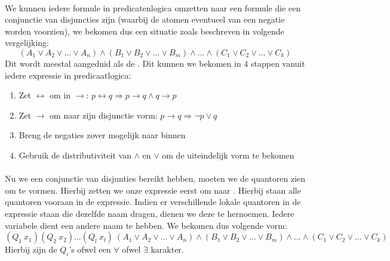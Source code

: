 \paragraph{}We kunnen iedere formule in predicatenlogica omzetten naar een formule die een conjunctie van disjuncties zijn (waarbij de atomen eventueel van een negatie worden voorzien), we bekomen dus een situatie zoals beschreven in volgende vergelijking:
\begin{equation}
\left(A_1\vee A_2\vee\ldots\vee A_n\right)\wedge\left(B_1\vee B_2\vee\ldots\vee B_m\right)\wedge\ldots\wedge\left(C_1\vee C_2\vee\ldots\vee C_k\right)
\end{equation}
Dit wordt meestal aangeduid als de . Dit kunnen we bekomen in 4 stappen vanuit iedere expressie in predicaatlogica:
\begin{enumerate}
 \item Zet $\leftrightarrow$ om in $\rightarrow$: $p\leftrightarrow q\Rightarrow p\rightarrow q\wedge q\rightarrow p$
 \item Zet $\rightarrow$ om naar zijn disjunctie vorm: $p\rightarrow q\Rightarrow \neg p\vee q$
 \item Breng de negaties zover mogelijk naar binnen
 \item Gebruik de distributiviteit van $\wedge$ en $\vee$ om de uiteindelijk vorm te bekomen
\end{enumerate}
\paragraph{}
Nu we een conjunctie van disjunties bereikt hebben, moeten we de quantoren zien om te vormen. Hierbij zetten we onze expressie eerst om naar . Hierbij staan alle quantoren vooraan in de expressie. Indien er verschillende lokale quantoren in de expressie staan die dezelfde naam dragen, dienen we deze te hernoemen. Iedere variabele dient een andere naam te hebben. We bekomen dus volgende vorm:
\begin{equation}
\left(Q_1\ x_1\right)\left(Q_2\ x_2\right)\ldots\left(Q_l\ x_l\right)\ \left(A_1\vee A_2\vee\ldots\vee A_n\right)\wedge\left(B_1\vee B_2\vee\ldots\vee B_m\right)\wedge\ldots\wedge\left(C_1\vee C_2\vee\ldots\vee C_k\right)
\end{equation}
Hierbij zijn de $Q_i$'s ofwel een $\forall$ ofwel $\exists$ karakter.
